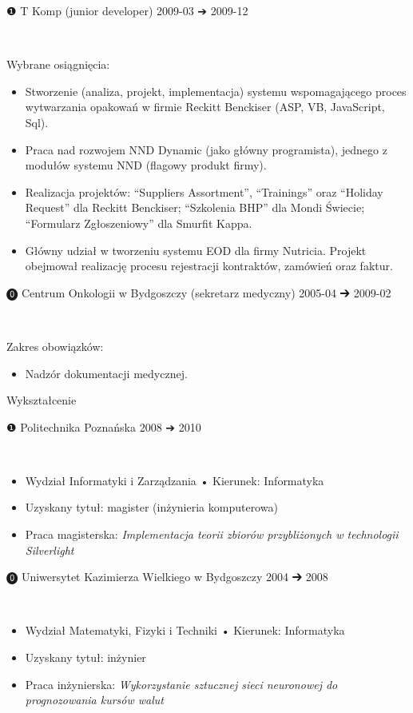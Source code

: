 \documentclass[a4paper,11pt]{report}
\newcommand{\cvEnuItemBox}[1]
{%
	\hspace{26pt}\parbox{.93\textwidth}{#1}
}
\newcommand{\cvSectionHeader}[1]
{%
	\setlength{\fboxsep}{0pt}%
	\setlength{\fboxrule}{0pt}%
	\colorbox{sectionbg}
	{%
		\color{sectionfg}%
		\begin{minipage}[t]{\textwidth}
			\begin{flushright}\vspace{12pt}
			{\fontsize{19pt}{1em}\addfontfeature{LetterSpace=7.0}\selectfont #1\hspace*{16pt}}\vspace{2pt}
			\end{flushright}%
		\end{minipage}%
	}%
}
\newcommand{\cvSectionEntry}[1]
{%
	\setlength{\fboxsep}{0pt}%
	\setlength{\fboxrule}{0pt}%
	\colorbox{sectionbg}
	{%
		\color{sectionfg}%
		\begin{minipage}[t]{\textwidth}
			#1 %
		\end{minipage}%
	}%
}
\newcommand{\cvSectionEntryHeader}[4]
{%
	\hspace{26pt}\parbox{.93\textwidth}
	{%
		\fontsize{13pt}{1em}\selectfont #1 \hspace{2pt} #2 \hfill #3 {\segoesym ➔} #4 %
	}\\
}
\newcommand{\cvSectionEntryBody}[2]
{%
	\cvEnuItemBox{\hspace{27pt}#1#2}
}
\begin{document}
\cvSectionEntry
{
	\cvSectionEntryHeader{❶}{T Komp (junior developer)}{2009-03}{2009-12}

	\cvSectionEntryBody{Wybrane osiągnięcia:}
	{
		\begin{itemize}
			\setlength\itemsep{0em}
			\item Stworzenie (analiza, projekt, implementacja) systemu wspomagającego proces wytwarzania opakowań w firmie Reckitt Benckiser (ASP, VB, JavaScript, Sql).
			\item Praca nad rozwojem NND Dynamic (jako główny programista), jednego z modułów systemu NND (flagowy produkt firmy).
			\item Realizacja projektów: “Suppliers Assortment”, “Trainings” oraz “Holiday Request” dla Reckitt Benckiser; “Szkolenia BHP” dla Mondi Świecie; “Formularz Zgłoszeniowy” dla Smurfit Kappa.
			\item Główny udział w tworzeniu systemu EOD dla firmy Nutricia. Projekt obejmował realizację procesu rejestracji kontraktów, zamówień oraz faktur.
		\end{itemize}
	}
}


\cvSectionEntry
{
	\cvSectionEntryHeader{⓿}{Centrum Onkologii w Bydgoszczy (sekretarz medyczny)}{2005-04}{2009-02}

	\cvSectionEntryBody{Zakres obowiązków:}
	{
		\begin{itemize}
			\setlength\itemsep{0em}
			\item Nadzór dokumentacji medycznej.
		\end{itemize}
	}
}



\cvSectionHeader{Wykształcenie}

\cvSectionEntryHeader{❶}{Politechnika Poznańska}{2008}{2010}

\cvSectionEntryBody{}
{
	\begin{itemize}
		\setlength\itemsep{0em}
		\item Wydział Informatyki i Zarządzania • Kierunek: Informatyka
		\item Uzyskany tytuł: magister (inżynieria komputerowa)
		\item Praca magisterska: \textit{Implementacja teorii zbiorów przybliżonych w technologii Silverlight}
	\end{itemize}
}

\cvSectionEntryHeader{⓿}{Uniwersytet Kazimierza Wielkiego w Bydgoszczy}{2004}{2008}

\cvSectionEntryBody{}
{
	\begin{itemize}
		\setlength\itemsep{0em}
		\item Wydział Matematyki, Fizyki i Techniki • Kierunek: Informatyka
		\item Uzyskany tytuł: inżynier
		\item Praca inżynierska: \textit{Wykorzystanie sztucznej sieci neuronowej do prognozowania kursów walut}
	\end{itemize}
}
\end{document}
